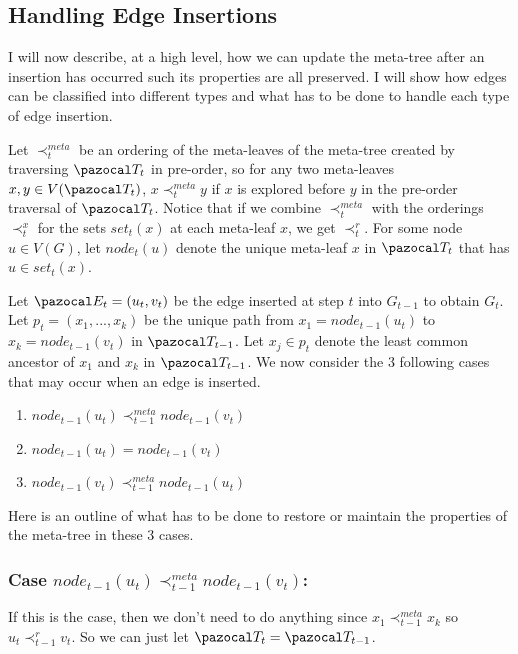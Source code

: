 \documentclass{report}
\begin{document}
\subsection{Handling Edge Insertions}

I will now describe, at a high level, how we can update the meta-tree after an insertion has occurred such its properties are all preserved. I will show how edges can be classified into different types and what has to be done to handle each type of edge insertion. 

Let $\prec_t^{meta}$ be an ordering of the meta-leaves of the meta-tree created by traversing $\pazocal T_t$ in pre-order, so for any two meta-leaves $x,y \in V(\pazocal T_t)$, $x \prec_t^{meta} y$ if $x$ is explored before $y$ in the pre-order traversal of $\pazocal T_t$. Notice that if we combine $\prec_t^{meta}$ with the orderings $\prec_t^x$ for the sets $set_t(x)$ at each meta-leaf $x$, we get $\prec_t^r$. For some node $u \in V(G)$, let $node_t(u)$ denote the unique meta-leaf $x$ in $\pazocal T_t$ that has $u \in set_t(x)$.

Let $\pazocal E_t=(u_t,v_t)$ be the edge inserted at step $t$ into $G_{t-1}$ to obtain $G_t$. Let $p_t = (x_1,...,x_k)$ be the unique path from $x_1 = node_{t-1}(u_t)$ to $x_k = node_{t-1}(v_t)$ in $\pazocal T_{t-1}$. Let $x_j\in p_t$ denote the least common ancestor of $x_1$ and $x_k$ in $\pazocal T_{t-1}$. We now consider the 3 following cases that may occur when an edge is inserted.

\begin{enumerate}
\item $node_{t-1}(u_t) \prec_{t-1}^{meta} node_{t-1}(v_{t})$
\item $node_{t-1}(u_t) = node_{t-1}(v_t)$
\item $node_{t-1}(v_t) \prec_{t-1}^{meta} node_{t-1}(u_t)$ 
\end{enumerate}

Here is an outline of what has to be done to restore or maintain the properties of the meta-tree in these 3 cases.

\subsubsection{Case $node_{t-1}(u_t) \prec_{t-1}^{meta} node_{t-1}(v_{t})$:}

If this is the case, then we don't need to do anything since $x_{1} \prec_{t-1}^{meta} x_{k}$ so $u_t \prec_{t-1}^r v_t$. So we can just let $\pazocal T_t= \pazocal T_{t-1}$.
\end{document}

